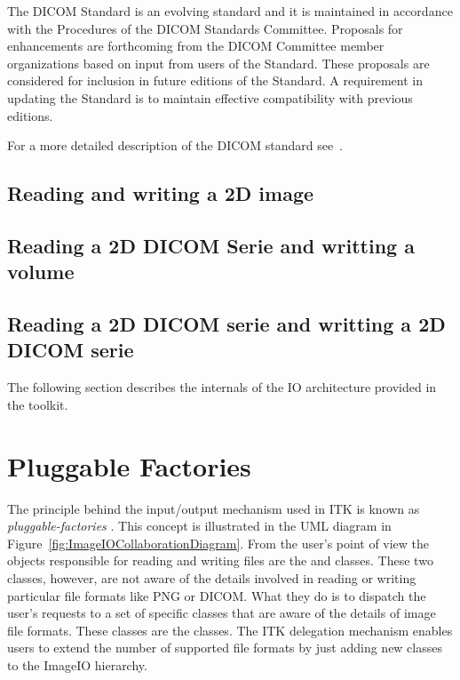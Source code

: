 The DICOM Standard is an evolving standard and it is maintained in accordance with the Procedures of
the DICOM Standards Committee. Proposals for enhancements are forthcoming from the DICOM
Committee member organizations based on input from users of the Standard. These proposals are
considered for inclusion in future editions of the Standard. A requirement in updating the Standard is to
maintain effective compatibility with previous editions.

For a more detailed description of the DICOM standard see~\cite{DICOMStandard}.

\subsection{Reading and writing a 2D image}


\subsection{Reading a 2D DICOM Serie and writting a volume}


\subsection{Reading a 2D DICOM serie and writting a 2D DICOM serie}




The following section describes the internals of the IO architecture provided
in the toolkit.

\section{Pluggable Factories}
\label{sec:ImageIOPluggableFactories}

The principle behind the input/output mechanism used in ITK is known as
\emph{pluggable-factories} \cite{Gamma1995}. This concept is illustrated in
the UML diagram in Figure~\ref{fig:ImageIOCollaborationDiagram}. From the
user's point of view the objects responsible for reading and writing files
are the  and 
classes. These two classes, however, are not aware of the details involved in
reading or writing particular file formats like PNG or DICOM.  What they do
is to dispatch the user's requests to a set of specific classes that are
aware of the details of image file formats. These classes are the
 classes. The ITK delegation mechanism enables users to
extend the number of supported file formats by just adding new classes to the
ImageIO hierarchy.

